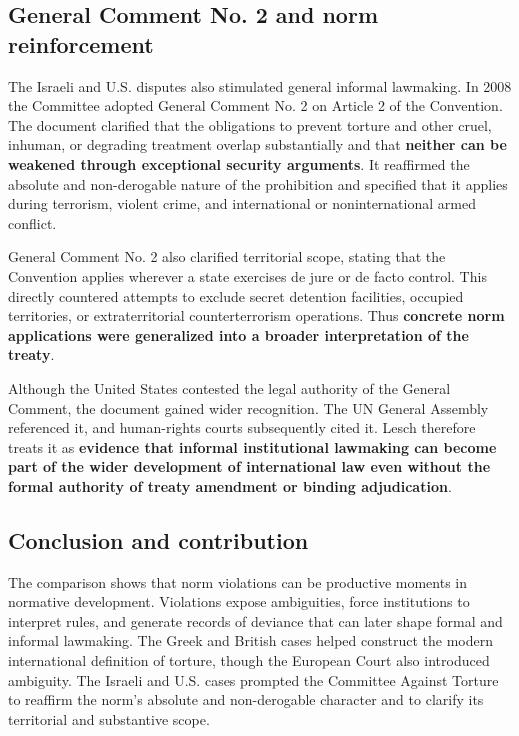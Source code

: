 \subsection{General Comment No. 2 and norm reinforcement}

The Israeli and U.S. disputes also stimulated general informal lawmaking. In 2008 the Committee adopted General Comment No. 2 on Article 2 of the Convention. The document clarified that the obligations to prevent torture and other cruel, inhuman, or degrading treatment overlap substantially and that \textbf{neither can be weakened through exceptional security arguments}. It reaffirmed the absolute and non-derogable nature of the prohibition and specified that it applies during terrorism, violent crime, and international or noninternational armed conflict.

General Comment No. 2 also clarified territorial scope, stating that the Convention applies wherever a state exercises de jure or de facto control. This directly countered attempts to exclude secret detention facilities, occupied territories, or extraterritorial counterterrorism operations. Thus \textbf{concrete norm applications were generalized into a broader interpretation of the treaty}.

Although the United States contested the legal authority of the General Comment, the document gained wider recognition. The UN General Assembly referenced it, and human-rights courts subsequently cited it. Lesch therefore treats it as \textbf{evidence that informal institutional lawmaking can become part of the wider development of international law even without the formal authority of treaty amendment or binding adjudication}.

\subsection{Conclusion and contribution}

The comparison shows that norm violations can be productive moments in normative development. Violations expose ambiguities, force institutions to interpret rules, and generate records of deviance that can later shape formal and informal lawmaking. The Greek and British cases helped construct the modern international definition of torture, though the European Court also introduced ambiguity. The Israeli and U.S. cases prompted the Committee Against Torture to reaffirm the norm's absolute and non-derogable character and to clarify its territorial and substantive scope.

